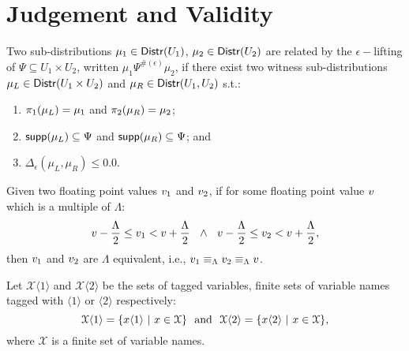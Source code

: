 \documentclass[a4paper,11pt]{article}
\begin{document}
\section{Judgement and Validity}
%
\begin{defn}
Two sub-distributions $\mu_1 \in \mathsf{Distr}(U_1)$, $\mu_2 \in \mathsf{Distr}(U_2)$ are related by the $\epsilon-$lifting of $\Psi \subseteq U_1 \times U_2$, written $\mu_1 \Psi^{\#(\epsilon)} \mu_2$, if there exist two witness sub-distributions $\mu_L \in \mathsf{Distr}(U_1 \times U_2)$ and $\mu_R \in \mathsf{Distr}(U_1, U_2)$ s.t.:
\begin{enumerate}
	\item $\pi_1(\mu_L) = \mu_1$ and $\pi_2(\mu_R) = \mu_2$;
	\item $\mathsf{supp}(\mu_L) \subseteq \Psi$ and $\mathsf{supp}(\mu_R) \subseteq \Psi$; and
	\item $\Delta_{\epsilon}(\mu_L, \mu_R) \leq 0.0$.
\end{enumerate}
\end{defn}
%
%
\begin{defn}
Given two floating point values $v_1$ and $v_2$, if for some floating point value $v$ which is a multiple of $\Lambda$:
\[
	v - \frac{\Lambda}{2} \leq v_1 < v + \frac{\Lambda}{2}
	~~
	\land
	~~
	v - \frac{\Lambda}{2} \leq v_2 < v + \frac{\Lambda}{2},	
\]
then $v_1$ and $v_2$ are $\Lambda$ equivalent, i.e., 
$v_1 \equiv_{\Lambda} v_2 \equiv_{\Lambda} v$.
\end{defn}
%
%
\begin{defn}
Let $\mathcal{X}\langle 1 \rangle$ and $\mathcal{X}\langle 2 \rangle$ be the sets of tagged variables, finite sets of variable names tagged with $\langle 1 \rangle$ or $\langle 2 \rangle$ respectively:
\[
	\mathcal{X}\langle 1 \rangle = \{x\langle 1 \rangle ~|~ x \in \mathcal{X}\}
	~~
	\text{and}
	~~
	\mathcal{X}\langle 2 \rangle = \{x\langle 2 \rangle ~|~ x \in \mathcal{X}\},
\]
where $\mathcal{X}$ is a finite set of variable names.
\end{defn}
%
\end{document}
